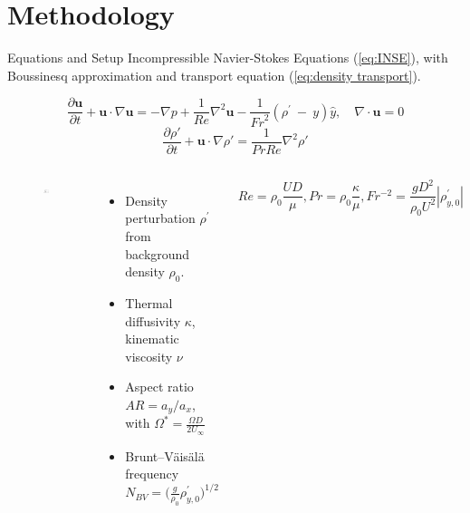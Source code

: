 \documentclass[aspectratio=169,xcolor=dvipsnames]{beamer}
\newcommand\Rey{\mathit{Re}}
\newcommand\Pran{\mathit{Pr}}
\begin{document}
\section{Methodology}

\begin{frame}{Equations and Setup}
    \small
    Incompressible Navier-Stokes Equations (\ref{eq:INSE}), with Boussinesq approximation and transport equation (\ref{eq:density transport}).
    
    \begin{equation}
        \label{eq:INSE}
        \frac{\partial\mathbf{u}}{\partial t}+\mathbf{u}\cdot\nabla\mathbf{u}=-\nabla p+\frac{1}{\Rey}\nabla^2\mathbf{u}-\frac{1}{{Fr}^2} (\rho^\prime\ -\ y )\hat{y}, \quad
        \nabla \cdot \textbf{u} = 0
    \end{equation}
    \begin{equation}
        \label{eq:density transport}
        \frac{\partial\rho '}{\partial t}+\mathbf{u}\cdot\nabla\rho'=\frac{1}{\Pran \Rey}\nabla^2\rho '
    \end{equation}   
    \vspace{-5pt} 
    \begin{columns}[c]
        \begin{figure}
            \includegraphics[width=.8\textwidth]{figures/flow_setup.pdf}
        \end{figure}
        \begin{itemize}
            \item Density perturbation $\rho^{\prime}$ from background density $\rho_0$.
            \item Thermal diffusivity $\kappa$, kinematic viscosity $\nu$
            \item Aspect ratio $AR = a_y / a_x$, with $\Omega^{\ast} = \frac{\Omega D}{2 U_{\infty}}$
            \item Brunt–Väisälä frequency $N_{BV} = \bigg( \frac{g}{\rho_0} \rho^{\prime}_{y,0} \bigg)^{1/2}$
        \end{itemize}
        \[\Rey = \rho_0 \frac{U D}{\mu}, \Pran = \rho_0 \frac{\kappa}{\mu}, Fr^{-2}=\frac{gD^2}{\rho_0 U^2}|\rho^{\prime}_{y,0}|\]
    \end{columns}
    \normalsize
\end{frame}
\end{document}
